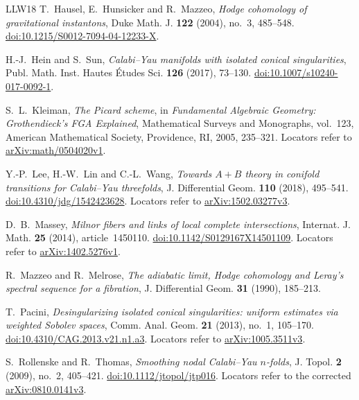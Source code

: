 \begin{thebibliography}{LLW18}
T.~Hausel, E.~Hunsicker and R.~Mazzeo,
\emph{Hodge cohomology of gravitational instantons},
Duke Math. J. \textbf{122} (2004), no.~3, 485--548.
\href{https://doi.org/10.1215/S0012-7094-04-12233-X}
{doi:10.1215/S0012-7094-04-12233-X}.

H.-J.~Hein and S.~Sun,
\emph{Calabi--Yau manifolds with isolated conical singularities},
Publ. Math. Inst. Hautes Études Sci. \textbf{126} (2017), 73--130.
\href{https://doi.org/10.1007/s10240-017-0092-1}
{doi:10.1007/s10240-017-0092-1}.

S.~L.~Kleiman,
\emph{The Picard scheme},
in \emph{Fundamental Algebraic Geometry: Grothendieck's FGA Explained},
Mathematical Surveys and Monographs, vol.~123,
American Mathematical Society, Providence, RI, 2005, 235--321.
Locators refer to
\href{https://arxiv.org/abs/math/0504020v1}{arXiv:math/0504020v1}.

Y.-P.~Lee, H.-W.~Lin and C.-L.~Wang,
\emph{Towards $A+B$ theory in conifold transitions for Calabi--Yau
threefolds},
J. Differential Geom. \textbf{110} (2018), 495--541.
\href{https://doi.org/10.4310/jdg/1542423628}
{doi:10.4310/jdg/1542423628}.
Locators refer to
\href{https://arxiv.org/abs/1502.03277v3}{arXiv:1502.03277v3}.

D.~B.~Massey,
\emph{Milnor fibers and links of local complete intersections},
Internat. J. Math. \textbf{25} (2014), article~1450110.
\href{https://doi.org/10.1142/S0129167X14501109}
{doi:10.1142/S0129167X14501109}.
Locators refer to
\href{https://arxiv.org/abs/1402.5276v1}{arXiv:1402.5276v1}.

R.~Mazzeo and R.~Melrose,
\emph{The adiabatic limit, Hodge cohomology and Leray's spectral
sequence for a fibration},
J. Differential Geom. \textbf{31} (1990), 185--213.

T.~Pacini,
\emph{Desingularizing isolated conical singularities: uniform estimates
via weighted Sobolev spaces},
Comm. Anal. Geom. \textbf{21} (2013), no.~1, 105--170.
\href{https://doi.org/10.4310/CAG.2013.v21.n1.a3}
{doi:10.4310/CAG.2013.v21.n1.a3}.
Locators refer to
\href{https://arxiv.org/abs/1005.3511v3}{arXiv:1005.3511v3}.

S.~Rollenske and R.~Thomas,
\emph{Smoothing nodal Calabi--Yau $n$-folds},
J. Topol. \textbf{2} (2009), no.~2, 405--421.
\href{https://doi.org/10.1112/jtopol/jtp016}{doi:10.1112/jtopol/jtp016}.
Locators refer to the corrected
\href{https://arxiv.org/abs/0810.0141v3}{arXiv:0810.0141v3}.


\end{thebibliography}
